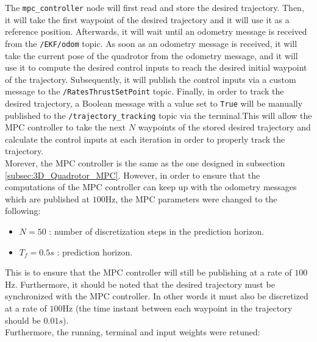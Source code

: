 \documentclass{thesisreport}
\begin{document}
The \texttt{mpc\_controller} node will first read and store the desired trajectory. Then, it will take the first waypoint of the desired trajectory and it will use it as a reference position. Afterwards, it will wait until an odometry message is received from the \texttt{/EKF/odom} topic. As soon as an odometry message is received, it will take the current pose of the quadrotor from the odometry message, and it will use it to compute the desired control inputs to reach the desired initial waypoint of the trajectory. Subsequently, it will publish the control inputs via a custom message to the \texttt{/RatesThrustSetPoint} topic. Finally, in order to track the desired trajectory, a Boolean message with a value set to \texttt{True} will be manually published to the \texttt{/trajectory\_tracking} topic via the terminal.This will allow the MPC controller to take the next $N$ waypoints of the stored desired trajectory and calculate the control inputs at each iteration in order to properly track the trajectory. \\ 

Morever, the MPC controller is the same as the one designed in subsection \ref{subsec:3D_Quadrotor_MPC}. However, in order to ensure that the computations of the MPC controller can keep up with the odometry messages which are published at $100$Hz, the  MPC parameters were changed to the following:

\begin{itemize}
	\item $N = 50$ : number of discretization steps in the prediction horizon.
	\item $T_f = 0.5s$ : prediction horizon.
\end{itemize}

This is to ensure that the MPC controller will still be publishing at a rate of $100$Hz. Furthermore, it should be noted that the desired trajectory must be synchronized with the MPC controller. In other words it must also be discretized at a rate of $100$Hz (the time instant between each waypoint in the trajectory should be $0.01s$).\\

Furthermore, the running, terminal and input weights were retuned:
\end{document}
